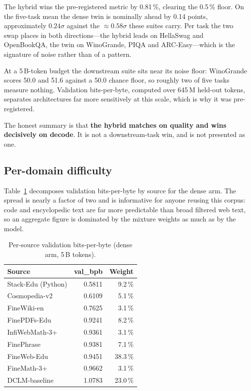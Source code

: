 \documentclass[conference]{IEEEtran}
\begin{document}
The hybrid wins the pre-registered metric by 0.81\,\%, clearing the 0.5\,\%
floor. On the five-task mean the dense twin is nominally ahead by 0.14 points,
approximately $0.24\sigma$ against the $\approx 0.58\sigma$ these suites carry.
Per task the two swap places in both directions---the hybrid leads on HellaSwag
and OpenBookQA, the twin on WinoGrande, PIQA and ARC-Easy---which is the
signature of noise rather than of a pattern.

At a 5\,B-token budget the downstream suite sits near its noise floor:
WinoGrande scores 50.0 and 51.6 against a 50.0 chance floor, so roughly two of
five tasks measure nothing. Validation bits-per-byte, computed over 645\,M
held-out tokens, separates architectures far more sensitively at this scale,
which is why it was pre-registered.

The honest summary is that \textbf{the hybrid matches on quality and wins
decisively on decode}. It is not a downstream-task win, and is not presented as
one.

\subsection{Per-domain difficulty}

Table~\ref{tab:persource} decomposes validation bits-per-byte by source for the
dense arm. The spread is nearly a factor of two and is informative for anyone
reusing this corpus: code and encyclopedic text are far more predictable than
broad filtered web text, so an aggregate figure is dominated by the mixture
weights as much as by the model.

\begin{table}[t]
\caption{Per-source validation bits-per-byte (dense arm, 5\,B tokens).}
\label{tab:persource}
\centering
\begin{tabular}{@{}lrr@{}}
\toprule
\textbf{Source} & \textbf{val\_bpb} & \textbf{Weight} \\
\midrule
Stack-Edu (Python)     & 0.5811 & 9.2\,\% \\
Cosmopedia-v2          & 0.6109 & 5.1\,\% \\
FineWiki-en            & 0.7625 & 3.1\,\% \\
FinePDFs-Edu           & 0.9241 & 8.2\,\% \\
InfiWebMath-3+         & 0.9361 & 3.1\,\% \\
FinePhrase             & 0.9381 & 7.1\,\% \\
FineWeb-Edu            & 0.9451 & 38.3\,\% \\
FineMath-3+            & 0.9662 & 3.1\,\% \\
DCLM-baseline          & 1.0783 & 23.0\,\% \\
\bottomrule
\end{tabular}
\end{table}
\end{document}
